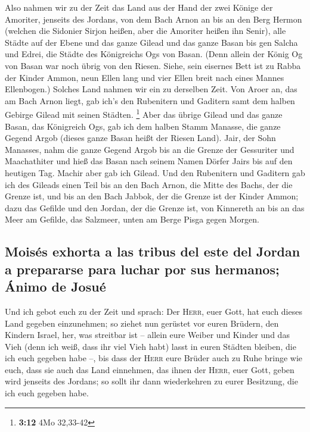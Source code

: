  Also nahmen wir zu der Zeit das Land aus der Hand der
zwei Könige der Amoriter, jenseits des Jordans, von dem Bach Arnon an
bis an den Berg Hermon  (welchen die Sidonier Sirjon
heißen, aber die Amoriter heißen ihn Senir),  alle Städte
auf der Ebene und das ganze Gilead und das ganze Basan bis gen Salcha
und Edrei, die Städte des Königreichs Ogs von Basan. 
(Denn allein der König Og von Basan war noch übrig von den Riesen.
Siehe, sein eisernes Bett ist zu Rabba der Kinder Ammon, neun Ellen lang
und vier Ellen breit nach eines Mannes Ellenbogen.) 
Solches Land nahmen wir ein zu derselben Zeit. Von Aroer an, das am Bach
Arnon liegt, gab ich's den Rubenitern und Gaditern samt dem halben
Gebirge Gilead mit seinen Städten. \footnote{\textbf{3:12} 4Mo 32,33-42}
 Aber das übrige Gilead und das ganze Basan, das
Königreich Ogs, gab ich dem halben Stamm Manasse, die ganze Gegend Argob
(dieses ganze Basan heißt der Riesen Land).  Jair, der
Sohn Manasses, nahm die ganze Gegend Argob bis an die Grenze der
Gessuriter und Maachathiter und hieß das Basan nach seinem Namen Dörfer
Jairs bis auf den heutigen Tag.  Machir aber gab ich
Gilead.  Und den Rubenitern und Gaditern gab ich des
Gileads einen Teil bis an den Bach Arnon, die Mitte des Bachs, der die
Grenze ist, und bis an den Bach Jabbok, der die Grenze ist der Kinder
Ammon;  dazu das Gefilde und den Jordan, der die Grenze
ist, von Kinnereth an bis an das Meer am Gefilde, das Salzmeer, unten am
Berge Pisga gegen Morgen.

\hypertarget{moisuxe9s-exhorta-a-las-tribus-del-este-del-jordan-a-prepararse-para-luchar-por-sus-hermanos-uxe1nimo-de-josuuxe9}{%
\subsection{Moisés exhorta a las tribus del este del Jordan a prepararse
para luchar por sus hermanos; Ánimo de
Josué}\label{moisuxe9s-exhorta-a-las-tribus-del-este-del-jordan-a-prepararse-para-luchar-por-sus-hermanos-uxe1nimo-de-josuuxe9}}

 Und ich gebot euch zu der Zeit und sprach: Der
\textsc{Herr}, euer Gott, hat euch dieses Land gegeben einzunehmen; so
ziehet nun gerüstet vor euren Brüdern, den Kindern Israel, her, was
streitbar ist --  allein eure Weiber und Kinder und das
Vieh (denn ich weiß, dass ihr viel Vieh habt) lasst in euren Städten
bleiben, die ich euch gegeben habe --,  bis dass der
\textsc{Herr} eure Brüder auch zu Ruhe bringe wie euch, dass sie auch
das Land einnehmen, das ihnen der \textsc{Herr}, euer Gott, geben wird
jenseits des Jordans; so sollt ihr dann wiederkehren zu eurer Besitzung,
die ich euch gegeben habe.

